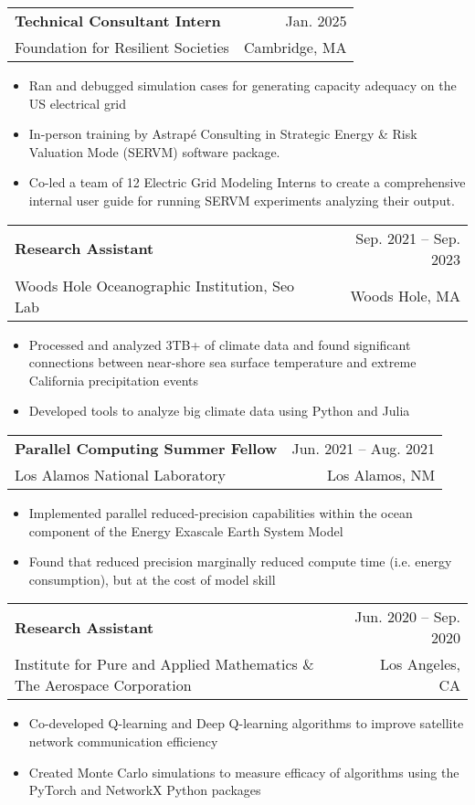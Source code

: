 \documentclass[letterpaper,11pt]{article}
\makeatletter
\newcommand{\resumeItem}[1]{
  \item\small{
    {#1 \vspace{-2pt}}
  }
}
\newcommand{\resumeSubheading}[4]{
  \vspace{-2pt}\item
    \begin{tabular*}{0.97\textwidth}[t]{@{\extracolsep{\fill}}p{0.6\textwidth}r}
      \textbf{\parbox[t]{0.6\textwidth}{#1}} & #2 \\
      \small \parbox[t]{0.6\textwidth}{#3} & {\small #4} \\
    \end{tabular*}\vspace{-7pt}
}
\newcommand{\resumeSubSubheading}[2]{
    \item
    \begin{tabular*}{0.97\textwidth}{l@{\extracolsep{\fill}}r}
      \textit{\small#1} & \textit{\small #2} \\
    \end{tabular*}\vspace{-7pt}
}
\newcommand{\resumeSubHeadingListEnd}{\end{itemize}}
\newcommand{\resumeItemListStart}{\begin{itemize}}
\newcommand{\resumeItemListEnd}{\end{itemize}\vspace{-5pt}}
\makeatother
\begin{document}
    \resumeSubheading
      {Technical Consultant Intern}{Jan. 2025}
      {Foundation for Resilient Societies}{Cambridge, MA}
      \resumeItemListStart
        \resumeItem{Ran and debugged simulation cases for generating capacity adequacy on the US electrical grid}
        \resumeItem{In-person training by Astrapé Consulting in Strategic Energy \& Risk Valuation Mode (SERVM) software package.}
        \resumeItem{Co-led a team of 12 Electric Grid Modeling Interns to create a comprehensive internal user guide for running SERVM experiments analyzing their output.}
      \resumeItemListEnd
      
    \resumeSubheading
      {Research Assistant}{Sep. 2021 -- Sep. 2023}
      {Woods Hole Oceanographic Institution, Seo Lab}{Woods Hole, MA}
      \resumeItemListStart
        \resumeItem{Processed and analyzed 3TB+ of climate data and found significant connections between near-shore sea surface temperature and 
        extreme California precipitation events}
        \resumeItem{Developed tools to analyze big climate data using Python and Julia}
      \resumeItemListEnd

    \resumeSubheading
      {Parallel Computing Summer Fellow}{Jun. 2021 -- Aug. 2021}
      {Los Alamos National Laboratory}{Los Alamos, NM}
      \resumeItemListStart
        \resumeItem{Implemented parallel reduced-precision capabilities within the ocean component of the Energy Exascale Earth System Model}
        \resumeItem{Found that reduced precision marginally reduced compute time (i.e. energy consumption), but at the cost of model skill}
    \resumeItemListEnd

    \resumeSubheading
      {Research Assistant}{Jun. 2020 -- Sep. 2020}
      {Institute for Pure and Applied Mathematics \& The Aerospace Corporation}{Los Angeles, CA}
      \resumeItemListStart
        \resumeItem{Co-developed Q-learning and Deep Q-learning algorithms to improve satellite network communication efficiency }
        \resumeItem{Created Monte Carlo simulations to measure efficacy of algorithms using the PyTorch and NetworkX  Python packages}
      \resumeItemListEnd
\end{document}

